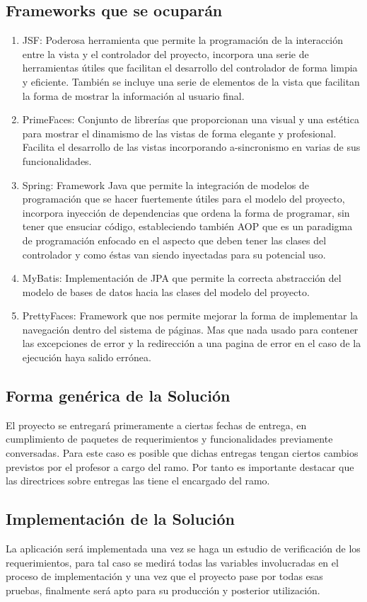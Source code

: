 \documentclass[a4paper,12pt,openany,oneside]{book}
\begin{document}
\subsection{Frameworks que se ocuparán}
\begin{enumerate}
\item JSF: Poderosa herramienta que permite la programación de la interacción entre la vista y el controlador del proyecto, incorpora una serie de herramientas útiles que facilitan el desarrollo del controlador de forma limpia y eficiente. También se incluye una serie de elementos de la vista que facilitan la forma de mostrar la información al usuario final.
\item PrimeFaces: Conjunto de librerías que proporcionan una visual y una estética para mostrar el dinamismo de las vistas de forma elegante y profesional. Facilita el desarrollo de las vistas incorporando a-sincronismo en varias de sus funcionalidades. 
\item Spring: Framework Java que permite la integración de modelos de programación que se hacer fuertemente útiles para el modelo del proyecto, incorpora inyección de dependencias que ordena la forma de programar, sin tener que ensuciar código, estableciendo también AOP que es un paradigma de programación enfocado en el aspecto que deben tener las clases del controlador y como éstas van siendo inyectadas para su potencial uso. 
\item MyBatis: Implementación de JPA que permite la correcta abstracción del modelo de bases de datos hacia las clases del modelo del proyecto.
\item PrettyFaces: Framework que nos permite mejorar la forma de implementar la navegación dentro del sistema de páginas. Mas que nada usado para contener las excepciones de error y la redirección a una pagina de error en el caso de la ejecución haya salido errónea.
\end{enumerate}
\subsection{Forma genérica de la Solución}
El proyecto se entregará primeramente a ciertas fechas de entrega, en cumplimiento de paquetes de requerimientos y funcionalidades previamente conversadas. Para este caso es posible que dichas entregas tengan ciertos cambios previstos por el profesor a cargo del ramo. Por tanto es importante destacar que las directrices sobre entregas las tiene el encargado del ramo.
\subsection{Implementación de la Solución}
La aplicación será implementada una vez se haga un estudio de verificación de los requerimientos, para tal caso se medirá todas las variables involucradas en el proceso de implementación y una vez que el proyecto pase por todas esas pruebas, finalmente será apto para su producción y posterior utilización.
\end{document}
